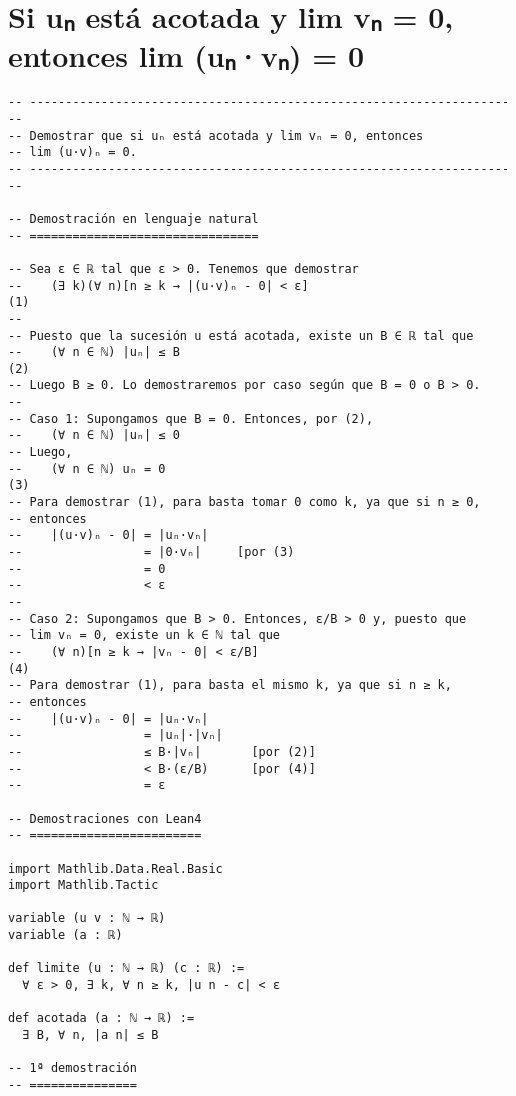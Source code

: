 \section{Si uₙ está acotada y lim vₙ = 0, entonces lim (uₙ·vₙ) = 0}
\label{sec:org24982db}
\begin{verbatim}
-- ---------------------------------------------------------------------
-- Demostrar que si uₙ está acotada y lim vₙ = 0, entonces
-- lim (u·v)ₙ = 0.
-- ---------------------------------------------------------------------

-- Demostración en lenguaje natural
-- ================================

-- Sea ε ∈ ℝ tal que ε > 0. Tenemos que demostrar
--    (∃ k)(∀ n)[n ≥ k → |(u·v)ₙ - 0| < ε]                           (1)
--
-- Puesto que la sucesión u está acotada, existe un B ∈ ℝ tal que
--    (∀ n ∈ ℕ) |uₙ| ≤ B                                             (2)
-- Luego B ≥ 0. Lo demostraremos por caso según que B = 0 o B > 0.
--
-- Caso 1: Supongamos que B = 0. Entonces, por (2),
--    (∀ n ∈ ℕ) |uₙ| ≤ 0
-- Luego,
--    (∀ n ∈ ℕ) uₙ = 0                                               (3)
-- Para demostrar (1), para basta tomar 0 como k, ya que si n ≥ 0,
-- entonces
--    |(u·v)ₙ - 0| = |uₙ·vₙ|
--                 = |0·vₙ|     [por (3)
--                 = 0
--                 < ε
--
-- Caso 2: Supongamos que B > 0. Entonces, ε/B > 0 y, puesto que
-- lim vₙ = 0, existe un k ∈ ℕ tal que
--    (∀ n)[n ≥ k → |vₙ - 0| < ε/B]                                  (4)
-- Para demostrar (1), para basta el mismo k, ya que si n ≥ k,
-- entonces
--    |(u·v)ₙ - 0| = |uₙ·vₙ|
--                 = |uₙ|·|vₙ|
--                 ≤ B·|vₙ|       [por (2)]
--                 < B·(ε/B)      [por (4)]
--                 = ε

-- Demostraciones con Lean4
-- ========================

import Mathlib.Data.Real.Basic
import Mathlib.Tactic

variable (u v : ℕ → ℝ)
variable (a : ℝ)

def limite (u : ℕ → ℝ) (c : ℝ) :=
  ∀ ε > 0, ∃ k, ∀ n ≥ k, |u n - c| < ε

def acotada (a : ℕ → ℝ) :=
  ∃ B, ∀ n, |a n| ≤ B

-- 1ª demostración
-- ===============


\end{verbatim}
